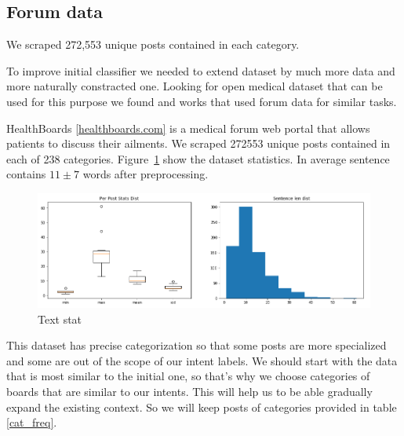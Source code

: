 \documentclass[11pt]{article}
\begin{document}
\subsection{Forum data}
\label{subsec:forumdata}
We scraped 272,553 unique posts contained in each category. 

To improve initial classifier we needed to extend dataset by much more data and more naturally constracted one. Looking for open medical dataset that can be used for this purpose we found \cite{zhang2015} and \cite{sondhi-EtAl:2010:POSTERS} works that used forum data for similar tasks.

HealthBoards \ref{healthboards.com} is a medical forum web portal that allows patients to discuss their ailments. We scraped 272553 unique posts contained in each of 238 categories. Figure~\ref{forum_data_stat} show the dataset statistics. In average sentence contains $11\pm7$ words after preprocessing.


 \begin{figure}[h]
 	\centering
 	\includegraphics[scale=0.4]{report3.png}
	\caption{Text stat}\label{forum_data_stat}
 \end{figure}
\FloatBarrier

This dataset has precise categorization so that some posts are more specialized and some are out of the scope of our intent labels. We should start with the data that is most similar to the initial one, so that's why we choose categories of boards that are similar to our intents. This will help us to be able gradually expand the existing context. So we will keep posts of categories provided in table \ref{cat_freq}.


\end{document}
